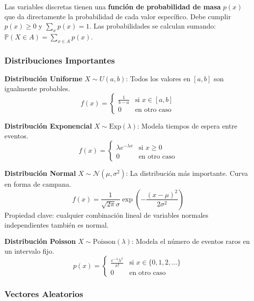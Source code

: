 \documentclass[
  11pt,
  letterpaper,
   addpoints,
  answers
  ]{exam}
\begin{document}
Las variables discretas tienen una \textbf{función de probabilidad de masa} $p(x)$ que da directamente la probabilidad de cada valor específico. Debe cumplir $p(x) \geq 0$ y $\sum_{x} p(x) = 1$. Las probabilidades se calculan sumando: $\mathbb{P}(X \in A) = \sum_{x \in A} p(x)$.

\subsubsection*{Distribuciones Importantes}

\textbf{Distribución Uniforme} $X \sim U(a,b)$: Todos los valores en $[a,b]$ son igualmente probables.
\begin{equation}
f(x) = \begin{cases}
\frac{1}{b-a} & \text{si } x \in [a,b] \\
0 & \text{en otro caso}
\end{cases}
\end{equation}

\textbf{Distribución Exponencial} $X \sim \text{Exp}(\lambda)$: Modela tiempos de espera entre eventos. 
\begin{equation}
f(x) = \begin{cases}
\lambda e^{-\lambda x} & \text{si } x \geq 0 \\
0 & \text{en otro caso}
\end{cases}
\end{equation}

\textbf{Distribución Normal} $X \sim \mathcal{N}(\mu, \sigma^2)$: La distribución más importante. Curva en forma de campana.
\begin{equation}
f(x) = \frac{1}{\sqrt{2\pi}\sigma} \exp\left(-\frac{(x-\mu)^2}{2\sigma^2}\right)
\end{equation}
Propiedad clave: cualquier combinación lineal de variables normales independientes también es normal.

\textbf{Distribución Poisson} $X \sim \text{Poisson}(\lambda)$: Modela el número de eventos raros en un intervalo fijo.
\begin{equation}
p(x) = \begin{cases}
\frac{e^{-\lambda}\lambda^x}{x!} & \text{si } x \in \{0, 1, 2, \ldots\} \\
0 & \text{en otro caso}
\end{cases}
\end{equation}

\subsubsection*{Vectores Aleatorios}
\end{document}
